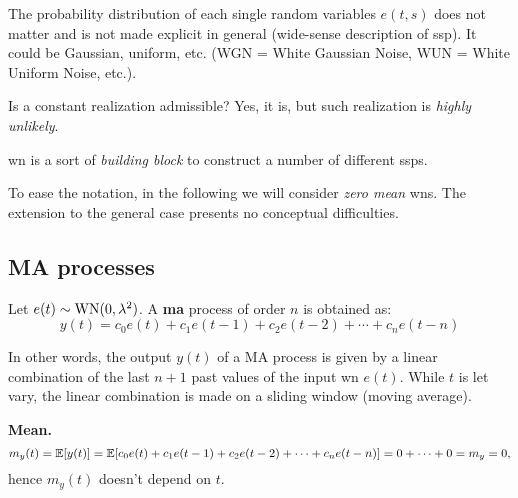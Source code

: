 \begin{figure}[htpb]
	\centering
\end{figure}
\FloatBarrier

\begin{obs}
The probability distribution of each single random variables $e(t,s)$ does not matter and is not made explicit in general (wide-sense description of \gls{ssp}).
It could be Gaussian, uniform, etc. (WGN = White Gaussian Noise, WUN = White Uniform Noise, etc.).
\end{obs}

\begin{obs}
Is a constant realization admissible? Yes, it is, but such realization is \emph{highly unlikely}.
\end{obs}
\gls{wn} is a sort of \emph{building block} to construct a number of different \glspl{ssp}.

To ease the notation, in the following we will consider \emph{zero mean} \glspl{wn}. The extension to the general case presents no conceptual difficulties.

\subsection{MA processes}

\begin{definition}
	Let $e(t) \sim \operatorname{WN}(0, \lambda^{2})$. A \textbf{\gls{ma}} process of order $n$ is obtained as:
	\[
		\boxed{y(t)=c_{0} e(t)+c_{1} e(t-1)+c_{2} e(t-2)+\cdots+c_{n} e(t-n)}
	\]
\end{definition}
In other words, the output $y(t)$ of a MA process is given by a linear combination of the last $n+1$ past values of the input \gls{wn} $e(t)$.
While $t$ is let vary, the linear combination is made on a sliding window (moving average).

\textbf{Mean.}
\[
	m_{y}(t)=\mathbb{E}[y(t)] = \mathbb{E}[c_{0} e(t)+c_{1} e(t-1)+c_{2} e(t-2)+\cdots+c_{n} e(t-n)] = 0+\cdots+0=m_{y}=0,
\]
hence $m_{y}(t)$ doesn't depend on $t$.

